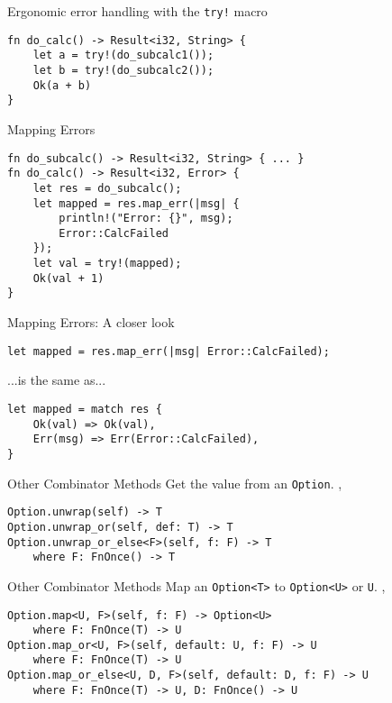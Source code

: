 
\begin{frame}[fragile]{Ergonomic error handling with the \texttt{try!} macro}
\begin{verbatim}
fn do_calc() -> Result<i32, String> {
    let a = try!(do_subcalc1());
    let b = try!(do_subcalc2());
    Ok(a + b)
}
\end{verbatim}
\end{frame}


\begin{frame}[fragile]{Mapping Errors}
\begin{verbatim}
fn do_subcalc() -> Result<i32, String> { ... }
fn do_calc() -> Result<i32, Error> {
    let res = do_subcalc();
    let mapped = res.map_err(|msg| {
        println!("Error: {}", msg);
        Error::CalcFailed
    });
    let val = try!(mapped);
    Ok(val + 1)
}
\end{verbatim}
\end{frame}


\begin{frame}[fragile]{Mapping Errors: A closer look}
\begin{verbatim}
let mapped = res.map_err(|msg| Error::CalcFailed);
\end{verbatim}
...is the same as...
\begin{verbatim}
let mapped = match res {
    Ok(val) => Ok(val),
    Err(msg) => Err(Error::CalcFailed),
}
\end{verbatim}
\end{frame}


\begin{frame}[fragile]{Other Combinator Methods}
Get the value from an \texttt{Option}.
\sep
\begin{verbatim}
Option.unwrap(self) -> T
Option.unwrap_or(self, def: T) -> T
Option.unwrap_or_else<F>(self, f: F) -> T
    where F: FnOnce() -> T
\end{verbatim}
\end{frame}


\begin{frame}[fragile]{Other Combinator Methods}
Map an \texttt{Option<T>} to \texttt{Option<U>} or \texttt{U}.
\sep
\begin{verbatim}
Option.map<U, F>(self, f: F) -> Option<U>
    where F: FnOnce(T) -> U
Option.map_or<U, F>(self, default: U, f: F) -> U
    where F: FnOnce(T) -> U
Option.map_or_else<U, D, F>(self, default: D, f: F) -> U
    where F: FnOnce(T) -> U, D: FnOnce() -> U
\end{verbatim}
\end{frame}

